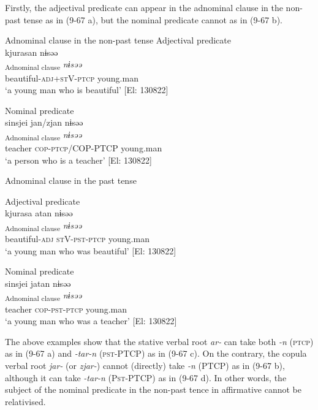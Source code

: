   Firstly, the adjectival predicate can appear in the adnominal clause in the non-past tense as in (9-67 a), but the nominal predicate cannot as in (9-67 b).

\ea  
\exi{} Adnominal clause in the non-past tense \label{ex:9.67}
\ea Adjectival predicate\\
 \glll  kjurasan  nɨsəə\\
    [\textit{kjura-sa+ar-n}]\textsubscript{Adnominal clause} \textit{nɨsəə}\\
    beautiful-\textsc{adj}+\textsc{st}V-\textsc{ptcp}  young.man\\
    \glt     ‘a young man who is beautiful’ [El: 130822]

\ex Nominal predicate\\
 \glll  *{\textbar}sinsjei{\textbar}  jan/zjan  nɨsəə\\
    [\textit{sinsjei}  \textit{jar-n}/\textit{zjar-n}]\textsubscript{Adnominal clause}  \textit{nɨsəə}\\
    teacher  \textsc{cop}-\textsc{ptcp}/COP-PTCP  young.man\\
     ‘a person who is a teacher’ [El: 130822]

\exi{} Adnominal clause in the past tense

\ex Adjectival predicate\\
 \glll  kjurasa  atan  nɨsəə\\
    [\textit{kjura-sa}  \textit{ar-tar-n}]\textsubscript{Adnominal clause}  \textit{nɨsəə}\\
    beautiful-\textsc{adj}  \textsc{st}V-\textsc{pst}-\textsc{ptcp}  young.man\\
    \glt     ‘a young man who was beautiful’ [El: 130822]

\ex Nominal predicate\\
 \glll  {\textbar}sinsjei{\textbar}  jatan  nɨsəə\\
    [\textit{sinsjei}  \textit{jar-tar-n}]\textsubscript{Adnominal clause}  \textit{nɨsəə}\\
    teacher  \textsc{cop}-\textsc{pst}-\textsc{ptcp}  young.man\\
    \glt      ‘a young man who was a teacher’ [El: 130822]
    \z
\z

The above examples show that the stative verbal root \textit{ar-} can take both \textit{{}-n} (\textsc{ptcp}) as in (9-67 a) and \textit{{}-tar-n} (\textsc{pst}-PTCP) as in (9-67 c). On the contrary, the copula verbal root \textit{jar-} (or \textit{zjar-}) cannot (directly) take \textit{{}-n} (PTCP) as in (9-67 b), although it can take \textit{{}-tar-n} (P\textsc{st}-PTCP) as in (9-67 d). In other words, the subject of the nominal predicate in the non-past tence in affirmative cannot be relativised.

